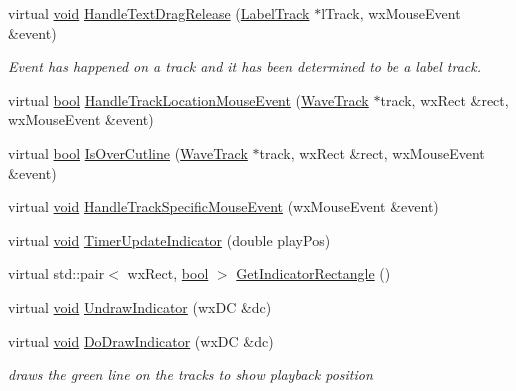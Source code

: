\begin{DoxyCompactItemize}
virtual \hyperlink{sound_8c_ae35f5844602719cf66324f4de2a658b3}{void} \hyperlink{class_track_panel_a39f65a04ecb950f794590d58261ab133}{Handle\+Text\+Drag\+Release} (\hyperlink{class_label_track}{Label\+Track} $\ast$l\+Track, wx\+Mouse\+Event \&event)
\begin{DoxyCompactList}\small\item\em Event has happened on a track and it has been determined to be a label track. \end{DoxyCompactList}\item 
virtual \hyperlink{mac_2config_2i386_2lib-src_2libsoxr_2soxr-config_8h_abb452686968e48b67397da5f97445f5b}{bool} \hyperlink{class_track_panel_a22d1ecd054e1b9122ac1da665a9ce3ce}{Handle\+Track\+Location\+Mouse\+Event} (\hyperlink{class_wave_track}{Wave\+Track} $\ast$track, wx\+Rect \&rect, wx\+Mouse\+Event \&event)
\item 
virtual \hyperlink{mac_2config_2i386_2lib-src_2libsoxr_2soxr-config_8h_abb452686968e48b67397da5f97445f5b}{bool} \hyperlink{class_track_panel_af6620f64f51ea8ceef45fbf34dbedccc}{Is\+Over\+Cutline} (\hyperlink{class_wave_track}{Wave\+Track} $\ast$track, wx\+Rect \&rect, wx\+Mouse\+Event \&event)
\item 
virtual \hyperlink{sound_8c_ae35f5844602719cf66324f4de2a658b3}{void} \hyperlink{class_track_panel_a4124de9c048941218d2085b54bf477db}{Handle\+Track\+Specific\+Mouse\+Event} (wx\+Mouse\+Event \&event)
\item 
virtual \hyperlink{sound_8c_ae35f5844602719cf66324f4de2a658b3}{void} \hyperlink{class_track_panel_a662d3dfeb567ae08aa8970e646ae719d}{Timer\+Update\+Indicator} (double play\+Pos)
\item 
virtual std\+::pair$<$ wx\+Rect, \hyperlink{mac_2config_2i386_2lib-src_2libsoxr_2soxr-config_8h_abb452686968e48b67397da5f97445f5b}{bool} $>$ \hyperlink{class_track_panel_a3c7126ed6ae625ba2c409c490a7b70e6}{Get\+Indicator\+Rectangle} ()
\item 
virtual \hyperlink{sound_8c_ae35f5844602719cf66324f4de2a658b3}{void} \hyperlink{class_track_panel_a024ccb44ef28e5ae33815fa67923447e}{Undraw\+Indicator} (wx\+DC \&dc)
\item 
virtual \hyperlink{sound_8c_ae35f5844602719cf66324f4de2a658b3}{void} \hyperlink{class_track_panel_a8ec4102237c8d4e852ef0f641712882d}{Do\+Draw\+Indicator} (wx\+DC \&dc)
\begin{DoxyCompactList}\small\item\em draws the green line on the tracks to show playback position \end{DoxyCompactList}\item 

\end{DoxyCompactItemize}
